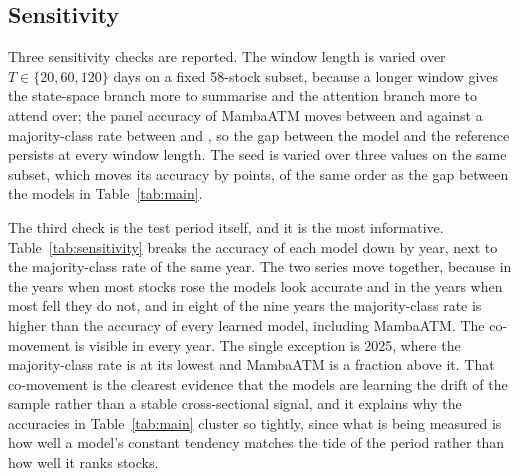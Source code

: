 \documentclass[pdflatex,sn-mathphys-ay]{sn-jnl}
\theoremstyle{thmstyleone}%
\theoremstyle{thmstyletwo}%
\theoremstyle{thmstyletwo}%
\begin{document}
\begin{table}[tbp]
	\centering
	\caption{Branches and fused variants, with the cross-stock standard deviation where the quantity is a mean over stocks.}
	\label{tab:ablation}
	
\end{table}

\subsection{Sensitivity}

Three sensitivity checks are reported. The window length is varied over $T \in \{20, 60, 120\}$ days
on a fixed 58-stock subset, because a longer window gives the state-space branch more to summarise
and the attention branch more to attend over; the panel accuracy of MambaATM moves between
\accTMin{} and \accTMax{} against a majority-class rate between \accMajTMin{} and \accMajTMax, so the
gap between the model and the reference persists at every window length. The seed is varied over
three values on the same subset, which moves its accuracy by \accSeedSd{} points, of the same order
as the gap between the models in Table~\ref{tab:main}.

The third check is the test period itself, and it is the most informative. Table~\ref{tab:sensitivity}
breaks the accuracy of each model down by year, next to the majority-class rate of the same year. The
two series move together, because in the years when most stocks rose the models look accurate and in
the years when most fell they do not, and in eight of the nine years the majority-class rate is
higher than the accuracy of every learned model, including MambaATM. The co-movement is visible in
every year. The single
exception is 2025, where the majority-class rate is at its lowest and MambaATM is a fraction above it.
That co-movement is the clearest evidence that the models are learning the drift of the sample rather
than a stable cross-sectional signal, and it explains why the accuracies in Table~\ref{tab:main}
cluster so tightly, since what is being measured is how well a model's constant tendency matches the
tide of the period rather than how well it ranks stocks.

\begin{table}[tbp]
	\centering
	\caption{Window length, seed and per-year stability. Rows are present only for the runs that were made; the per-year block reports the accuracy of the proposed model against the majority-class rate of the same year.}
	\label{tab:sensitivity}
	
\end{table}
\end{document}
